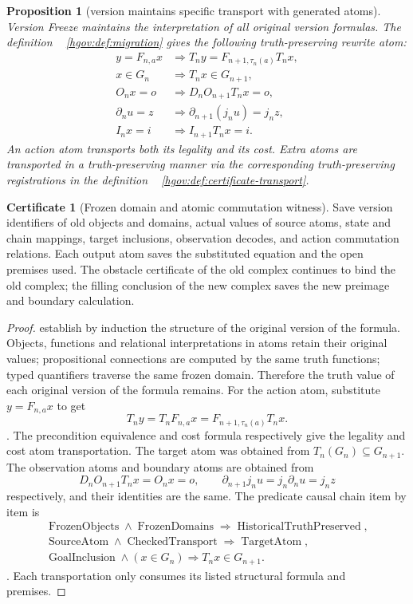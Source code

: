 \documentclass[12pt,a4paper,openany,notitlepage]{report}
\theoremstyle{plain}
\newtheorem{proposition}[theorem]{Proposition}
\theoremstyle{definition}
\newtheorem*{certificate}{Certificate}
\theoremstyle{remark}
\begin{document}
\begin{CJK*}
\begin{proposition}
[version maintains specific transport with generated atoms]\label{hgov:prop:atomic-transport}
Version Freeze maintains the interpretation of all original version formulas. The definition ~ \ref{hgov:def:migration} gives the following truth-preserving rewrite atom: \[
 \begin{aligned}
 y=F_{n,a}x
 &\Longrightarrow T_ny=F_{n+1,\tau_n(a)}T_nx,\\
 x\in G_n&\Longrightarrow T_nx\in G_{n+1},\\
 O_nx=o&\Longrightarrow D_nO_{n+1}T_nx=o,\\
 \partial_nu=z
 &\Longrightarrow \partial_{n+1}(j_nu)=j_nz,\\
 I_nx=i&\Longrightarrow I_{n+1}T_nx=i .
 \end{aligned}
\] An action atom transports both its legality and its cost. Extra atoms are transported in a truth-preserving manner via the corresponding truth-preserving registrations in the definition ~ \ref{hgov:def:certificate-transport}.\end{proposition}
\begin{certificate}
[Frozen domain and atomic commutation witness]Save version identifiers of old objects and domains, actual values of source atoms, state and chain mappings, target inclusions, observation decodes, and action commutation relations. Each output atom saves the substituted equation and the open premises used. The obstacle certificate of the old complex continues to bind the old complex; the filling conclusion of the new complex saves the new preimage and boundary calculation.\end{certificate}
\begin{proof}
establish by induction the structure of the original version of the formula. Objects, functions and relational interpretations in atoms retain their original values; propositional connections are computed by the same truth functions; typed quantifiers traverse the same frozen domain. Therefore the truth value of each original version of the formula remains. For the action atom, substitute $y=F_{n,a}x$ to get \[
 T_ny=T_nF_{n,a}x=F_{n+1,\tau_n(a)}T_nx.
\]. The precondition equivalence and cost formula respectively give the legality and cost atom transportation. The target atom was obtained from $T_n(G_n)\subseteq G_{n+1}$. The observation atoms and boundary atoms are obtained from \[
 D_nO_{n+1}T_nx=O_nx=o,\qquad
 \partial_{n+1}j_nu=j_n\partial_nu=j_nz
\] respectively, and their identities are the same. The predicate causal chain item by item is \[
 \begin{gathered}
 \operatorname{FrozenObjects}\land\operatorname{FrozenDomains}
 \Longrightarrow\operatorname{HistoricalTruthPreserved},\\
 \operatorname{SourceAtom}\land\operatorname{CheckedTransport}
 \Longrightarrow\operatorname{TargetAtom},\\
 \operatorname{GoalInclusion}\land(x\in G_n)
 \Longrightarrow T_nx\in G_{n+1}.
 \end{gathered}
\]. Each transportation only consumes its listed structural formula and premises.\end{proof}



\end{CJK*}
\end{document}
